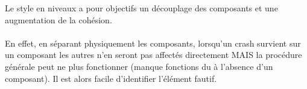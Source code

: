 \item{}
{\faux}
{Le style en niveaux a pour objectifs un découplage des composants et une augmentation de la cohésion.

\paragraph{}
En effet, en séparant physiquement les composants, lorsqu'un crash survient sur un composant les autres n'en seront pas affectés directement MAIS la procédure générale peut ne plus fonctionner (manque fonctions du à l'absence d'un composant). Il est alors facile d'identifier l'élément fautif.

}

